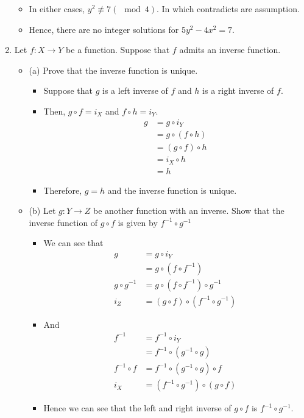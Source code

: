 \documentclass[letterpaper,12pt]{article}
\begin{document}
\begin{enumerate}
\begin{itemize}
	\item In either cases, $y^2 \not \equiv 7 (\mod 4)$. In which contradicts are assumption.
	\item Hence, there are no integer solutions for $5y^2-4x^2 = 7$.
\end{itemize}
\item Let $f:X \rightarrow Y$ be a function. Suppose that $f$ admits an inverse function.
\begin{itemize}
	\item (a) Prove that the inverse function is unique.
	\begin{itemize}
	\item Suppose that $g$ is a left inverse of $f $ and $h$ is a right inverse of $f$.
	\item Then, $g \circ f =i_{X} $ and $f \circ h = i_Y$.
	\begin{align}
		g&=g \circ i_Y \\&=g \circ (f \circ h) \\ &=(g \circ f) \circ h \\ &=i_X \circ h \\ &=h
	\end{align}
	\item Therefore, $g=h$ and the inverse function is unique.
	\end{itemize}
	\item (b) Let $g:Y \rightarrow Z$ be another function with an inverse. Show that the inverse function of $g \circ f$ is given by $f^{-1} \circ g^{-1}$
	\begin{itemize}
	\item We can see that 
	\begin{align}
		g &= g \circ i_Y \\ &= g\circ (f\circ f^{-1}) \\g \circ g^{-1} &= g\circ (f \circ f^{-1}) \circ g^{-1}  \\ i_Z &= (g\circ f) \circ (f^{-1} \circ g^{-1})
	\end{align}
	\item And
	\begin{align}
		f^{-1} &= f^{-1} \circ i_Y \\ &=f^{-1}\circ (g^{-1} \circ g) \\ f^{-1} \circ f &= f^{-1} \circ (g^{-1} \circ g) \circ f \\ i_X &= (f^{-1} \circ g^{-1}) \circ (g \circ f)
	\end{align}
	\item Hence we can see that the left and right inverse of $g \circ f$ is $f^{-1} \circ g^{-1}$.

\end{itemize}
\end{itemize}
\end{enumerate}
\end{document}
